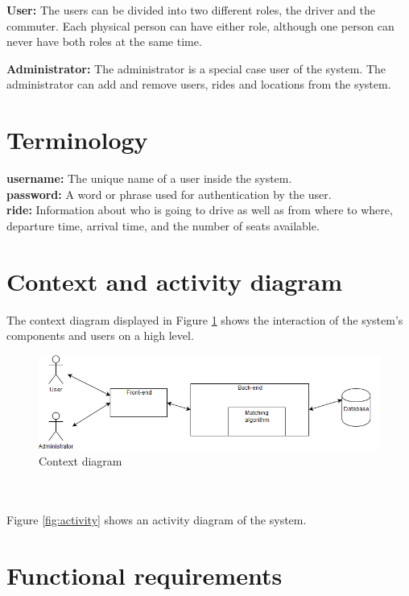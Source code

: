 \documentclass{article}
\begin{document}
\textbf{User:} The users can be divided into two different roles, the driver and the commuter. Each physical person can have either role, although one person can never have both roles at the same time.

\textbf{Administrator:} The administrator is a special case user of the system. The administrator can add and remove users, rides and locations from the system. 

\section{Terminology}
\textbf{username:} The unique name of a user inside the system.
\\
\textbf{password:} A word or phrase used for authentication by the user.
\\
\textbf{ride:} Information about who is going to drive as well as from where to where, departure time, arrival time, and the number of seats available.

\section{Context and activity diagram}
The context diagram displayed in Figure \ref{fig:context} shows the interaction of the system's components and users on a high level.
\begin{figure}
  \centering
  \includegraphics[scale=0.45]{Contextdiagram.png}
  \caption{Context diagram}
  \label{fig:context}
\end{figure}
\\ \\ 
Figure \ref{fig:activity} shows an activity diagram of the system.
\section{Functional requirements}
\end{document}
